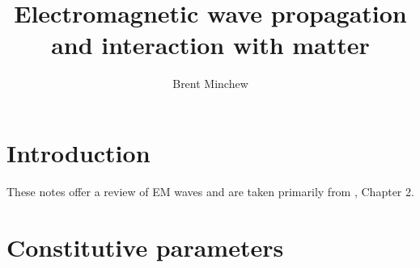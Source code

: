 \documentclass[11pt, oneside]{article}
\title{Electromagnetic wave propagation and interaction with matter}
\author{Brent Minchew}
\begin{document}
\maketitle

\section{Introduction}


These notes offer a review of EM waves and are taken primarily from \citet{ulaby2014}, Chapter 2.

\section{Constitutive parameters}
\renewcommand\labelitemi{{\boldmath$\cdot$}}
\end{document}
